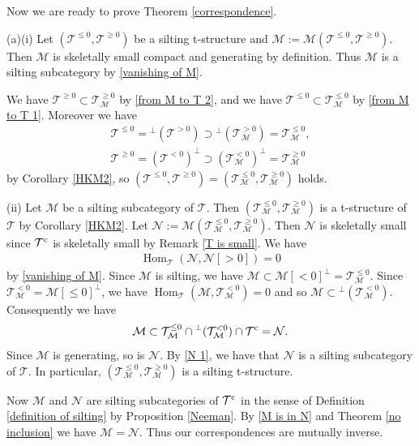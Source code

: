 \documentclass[a4paper,reqno]{amsart}
\newtheorem{lemma}[theorem]{Lemma}
\theoremstyle{definition}
\newcommand{\TT}{{\mathcal T}}
\newcommand{\MM}{{\mathcal M}}
\newcommand{\NN}{{\mathcal N}}
\newcommand{\Z}{\mathbb{Z}}
\newcommand{\Hom}{\operatorname{Hom}\nolimits}
\begin{document}

Now we are ready to prove Theorem \ref{correspondence}.

(a)(i) Let $(\TT^{\le0},\TT^{\ge0})$ be a silting t-structure and $\MM:=\MM(\TT^{\le0},\TT^{\ge0})$.
Then $\MM$ is skeletally small compact and generating by definition. Thus $\MM$ is a silting subcategory by \eqref{vanishing of M}. 

We have $\TT^{\ge0}\subset\TT_{\MM}^{\ge0}$ by \eqref{from M to T 2}, and we have $\TT^{\le0}\subset\TT_{\MM}^{\le0}$ by \eqref{from M to T 1}.
Moreover we have
\begin{eqnarray*}
\TT^{\le0}={}^\perp(\TT^{>0})\supset{}^\perp(\TT_{\MM}^{>0})=\TT_{\MM}^{\le0},\\
\TT^{\ge0}=(\TT^{<0})^\perp\supset(\TT_{\MM}^{<0})^\perp=\TT_{\MM}^{\ge0}
\end{eqnarray*}
by Corollary \ref{HKM2}, so $(\TT^{\le0},\TT^{\ge0})=(\TT_{\MM}^{\le0},\TT_{\MM}^{\ge0})$ holds.

(ii) Let $\MM$ be a silting subcategory of $\TT$.
Then $(\TT_{\MM}^{\le0},\TT_{\MM}^{\ge0})$ is a t-structure of $\TT$ by Corollary \ref{HKM2}.
Let $\NN:=\MM(\TT_{\MM}^{\le0},\TT_{\MM}^{\ge0})$.
Then $\NN$ is skeletally small since $\TT^{\rm c}$ is skeletally small by Remark \ref{T is small}.
We have
\begin{eqnarray}\label{N 1}
\Hom_{\TT}(\NN,\NN[>0])=0
\end{eqnarray}
by \eqref{vanishing of M}.
Since $\MM$ is silting, we have $\MM\subset\MM[<0]^\perp=\TT_{\MM}^{\le0}$.
Since $\TT_{\MM}^{<0}=\MM[\le0]^\perp$, we have
$\Hom_{\TT}(\MM,\TT_{\MM}^{<0})=0$ and so $\MM\subset{}^\perp(\TT_{\MM}^{<0})$.
Consequently we have
\begin{equation}\label{M is in N}
\MM\subset\TT_{\MM}^{\le0}\cap{}^\perp(\TT_{\MM}^{<0})\cap\TT^{\rm c}=\NN.
\end{equation}
Since $\MM$ is generating, so is $\NN$.
By \eqref{N 1}, we have that $\NN$ is a silting subcategory of $\TT$.
In particular, $(\TT_{\MM}^{\le0},\TT_{\MM}^{\ge0})$ is a silting t-structure.

Now $\MM$ and $\NN$ are silting subcategories of $\TT^{\rm c}$ in the sense of Definition \ref{definition of silting} by Proposition \ref{Neeman}.
By \eqref{M is in N} and Theorem \ref{no inclusion} we have $\MM=\NN$.
Thus our correspondences are mutually inverse.
\end{document}
